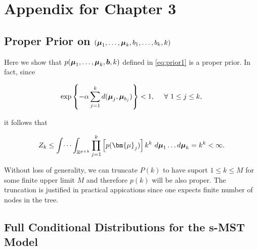 

\chapter{Appendix for Chapter 3}
\label{appendix_C}

\section{Proper Prior on $(\mbox{\boldmath $\mu$}_1, \ldots, \mbox{\boldmath $\mu$}_k, b_1, \ldots, b_k, k)$}
\label{sec:proper_prior}

Here we show that $p(\mbox{\boldmath $\mu$}_1, \dots, \mbox{\boldmath $\mu$}_k, \mbox{\boldmath $b$}, k)$ defined in \eqref{eq:prior1} is a proper prior. In fact, since 

$$ \exp\left\{- \alpha \sum_{j=1}^k d(\mbox{\boldmath $\mu$}_j, \mbox{\boldmath $\mu$}_{b_j}) \right\}<1, \ \ \ \ \forall \ 1 \leq j \leq k,$$

\noindent it follows that

$$Z_k \leq \int \dots \int_{\mathbb{R}^{p \times k}} \prod_{j=1}^k \left[ p(\bm{\mu}_j)\right]k^k \ d\bfmu_1 \dots  d\bfmu_k = k^k < \infty.$$

\noindent Without loss of generality, we can truncate $P(k)$ to have suport $1\leq k \leq M$ for some finite upper limit $M$ and therefore $p(k)$ will be also proper. The truncation is justified in practical appications since one expects finite number of nodes in the tree.


\section{Full Conditional Distributions for the s-MST Model}
\label{sec:app_smst}

